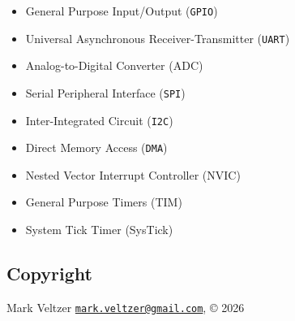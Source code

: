 \documentclass[
]{article}
\providecommand{\tightlist}{%
  \setlength{\itemsep}{0pt}\setlength{\parskip}{0pt}}
\begin{document}
\begin{itemize}
  \begin{itemize}
  \tightlist
  \item
    General Purpose Input/Output (\texttt{GPIO})
  \item
    Universal Asynchronous Receiver-Transmitter (\texttt{UART})
  \item
    Analog-to-Digital Converter (ADC)
  \item
    Serial Peripheral Interface (\texttt{SPI})
  \item
    Inter-Integrated Circuit (\texttt{I2C})
  \item
    Direct Memory Access (\texttt{DMA})
  \item
    Nested Vector Interrupt Controller (NVIC)
  \item
    General Purpose Timers (TIM)
  \item
    System Tick Timer (SysTick)
  \end{itemize}
\end{itemize}

\subsection{Copyright}\label{copyright}

Mark Veltzer
\href{mailto:mark.veltzer@gmail.com}{\nolinkurl{mark.veltzer@gmail.com}},
© 2026
\end{document}
